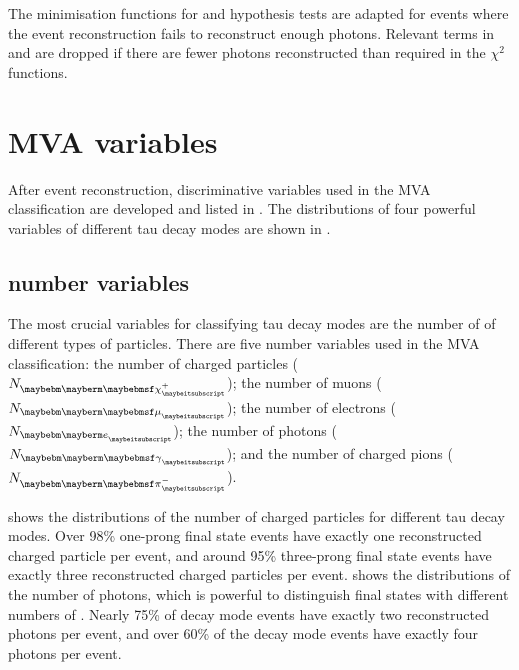 
The  minimisation functions for \Prho and \Pai  hypothesis tests are adapted for events where the event reconstruction fails to reconstruct enough photons. Relevant terms in  and  are dropped if there are fewer photons reconstructed  than required in the $\chi^{2}$ functions.


\section{MVA variables}
\label{sec:tauVar}

After event reconstruction, discriminative variables used in the MVA  classification  are  developed and listed in . The distributions of four powerful variables of different tau decay modes are shown in .


\subsection{\PFOs number variables}

The most crucial variables for classifying tau decay modes  are the number of \PFOs of different types of particles. There are five \PFOs number variables used in the MVA classification: the number of charged particles (${N}_{\charge}$); the number of muons (${N}_{\Pmu}$); the number of electrons (${N}_{\Pe}$); the number of photons (${N}_{\Pgg}$); and the number of charged pions (${N}_{\Pgpm}$).

 shows the distributions of the number of charged particles for different tau decay modes. Over 98\% one-prong final state events have exactly one reconstructed charged particle  per event, and around 95\%  three-prong final state events have exactly three reconstructed charged particles  per event.  shows the distributions of the number of photons, which is powerful to distinguish final states with different numbers of \Ppizero. Nearly 75\% of  \decayRhoShort decay mode events have exactly two reconstructed photons per event, and over 60\% of the \decayAiPhotonShort decay mode events have exactly four photons per event.

